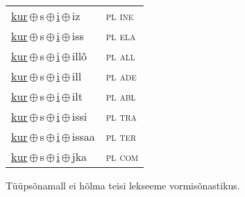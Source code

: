 \begin{minipage}{\textwidth}
\begin{sideways}
\begin{tabular}{l l}
\underline{kur}\,$\oplus$\,s\,$\oplus$\,\underline{i}\,$\oplus$\,iz & \textsc{ pl ine } \\
\underline{kur}\,$\oplus$\,s\,$\oplus$\,\underline{i}\,$\oplus$\,iss & \textsc{ pl ela } \\
\underline{kur}\,$\oplus$\,s\,$\oplus$\,\underline{i}\,$\oplus$\,illõ & \textsc{ pl all } \\
\underline{kur}\,$\oplus$\,s\,$\oplus$\,\underline{i}\,$\oplus$\,ill & \textsc{ pl ade } \\
\underline{kur}\,$\oplus$\,s\,$\oplus$\,\underline{i}\,$\oplus$\,ilt & \textsc{ pl abl } \\
\underline{kur}\,$\oplus$\,s\,$\oplus$\,\underline{i}\,$\oplus$\,issi & \textsc{ pl tra } \\
\underline{kur}\,$\oplus$\,s\,$\oplus$\,\underline{i}\,$\oplus$\,issaa & \textsc{ pl ter } \\
\underline{kur}\,$\oplus$\,s\,$\oplus$\,\underline{i}\,$\oplus$\,jka & \textsc{ pl com } \\
\end{tabular}
\end{sideways}
\label{tab:tüüpsõnamall-kursi}

\end{minipage}

 
\vspace{1em}
\noindent Tüüpsõnamall  ei hõlma teisi lekseeme vormi\-sõnastikus.

